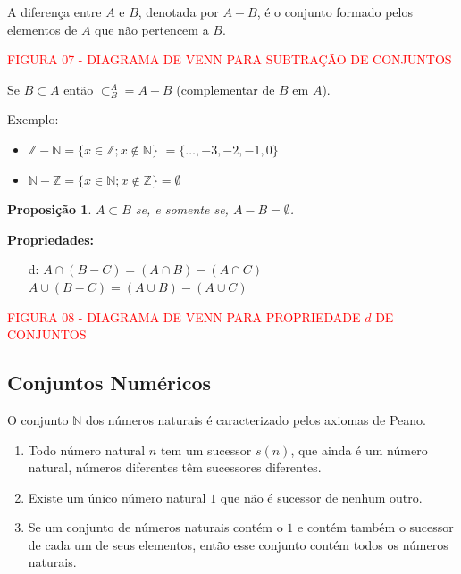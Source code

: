 \documentclass[oneside,a4paper,12pt]{article}
\newtheorem{proposition}{Proposição}[section]
\begin{document}
A diferença entre $A$ e $B$, denotada por $A - B$, é o conjunto formado pelos elementos de $A$ que não pertencem a $B$.

\vspace{90pt}

\begin{center}
	\textcolor{red}{FIGURA 07 - DIAGRAMA DE VENN PARA SUBTRAÇÃO DE CONJUNTOS}	
\end{center}
	
Se $B \subset A$ então $\subset_{B}^{A} = A - B$ (complementar de $B$ em $A$).

Exemplo:
\begin{itemize}
	\item $\mathbb{Z} - \mathbb{N} = \{x \in \mathbb{Z} ; x \notin \mathbb{N} \}$  $=\{\dots, -3, -2, -1, 0 \}$
	\item $\mathbb{N} - \mathbb{Z} = \{x \in \mathbb{N}; x \notin \mathbb{Z} \} = \emptyset$
\end{itemize}	
	
\begin{proposition}
	$A \subset B$ se, e somente se, $A - B = \emptyset$.
\end{proposition}	
	
\textbf{Propriedades:}
\begin{itemize}
	\item [d:] $A \cap (B - C) = (A \cap B) - (A \cap C)$ \\ $A \cup (B - C) = (A \cup B) - (A \cup C)$
\end{itemize}

\vspace{90pt}

\begin{center}
	\textcolor{red}{FIGURA 08 - DIAGRAMA DE VENN PARA PROPRIEDADE $d$ DE CONJUNTOS}		
\end{center}
	
	
	
\subsection{Conjuntos Numéricos}
	
O conjunto $\mathbb{N}$	dos números naturais é caracterizado pelos axiomas de Peano.

\begin{enumerate}
	\item Todo número natural $n$ tem um sucessor $s(n)$, que ainda é um número natural, números diferentes têm sucessores diferentes.
	\item Existe um único número natural $1$ que não é sucessor de nenhum outro.
	\item Se um conjunto de números naturais contém o $1$ e contém também o sucessor de cada um de seus elementos, então esse conjunto contém todos os números naturais.
\end{enumerate}
\end{document}
